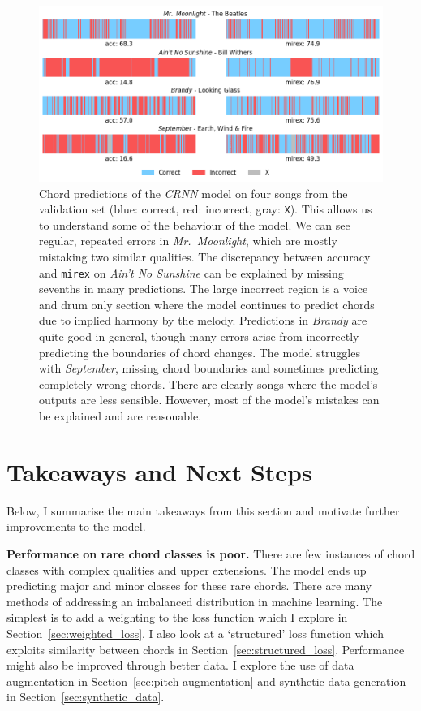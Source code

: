 \begin{figure}[ht]
    \centering
    \includegraphics[width=1.0\textwidth]{figures/chord_recognition_examples.png}
    \caption{Chord predictions of the \emph{CRNN} model on four songs from the validation set (blue: correct, red: incorrect, gray: \texttt{X}). This allows us to understand some of the behaviour of the model. We can see regular, repeated errors in \emph{Mr.\ Moonlight}, which are mostly mistaking two similar qualities. The discrepancy between accuracy and \texttt{mirex} on \emph{Ain't No Sunshine} can be explained by missing sevenths in many predictions. The large incorrect region is a voice and drum only section where the model continues to predict chords due to implied harmony by the melody. Predictions in \emph{Brandy} are quite good in general, though many errors arise from incorrectly predicting the boundaries of chord changes. The model struggles with \emph{September}, missing chord boundaries and sometimes predicting completely wrong chords. There are clearly songs where the model's outputs are less sensible. However, most of the model's mistakes can be explained and are reasonable.}\label{fig:crnn_examples}
\end{figure}

\section{Takeaways and Next Steps}

Below, I summarise the main takeaways from this section and motivate further improvements to the model.

\textbf{Performance on rare chord classes is poor.} There are few instances of chord classes with complex qualities and upper extensions. The model ends up predicting major and minor classes for these rare chords. There are many methods of addressing an imbalanced distribution in machine learning. The simplest is to add a weighting to the loss function which I explore in Section~\ref{sec:weighted_loss}. I also look at a `structured' loss function which exploits similarity between chords in Section~\ref{sec:structured_loss}. Performance might also be improved through better data. I explore the use of data augmentation in Section~\ref{sec:pitch-augmentation} and synthetic data generation in Section~\ref{sec:synthetic_data}.

